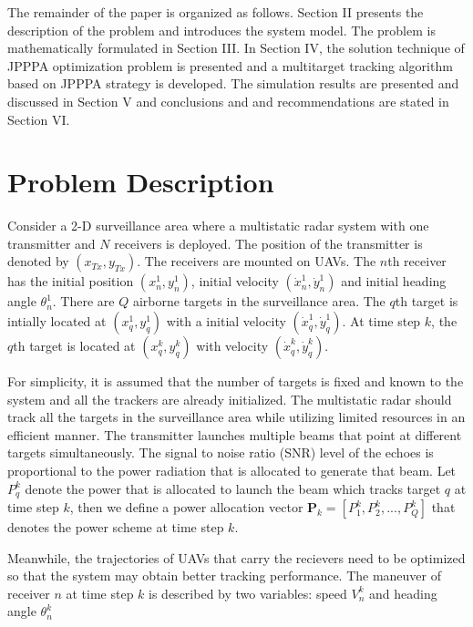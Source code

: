 \documentclass[12pt,journal,draftclsnofoot,onecolumn]{IEEEtran}
\begin{document}
The remainder of the paper is organized as follows. Section II presents the description of the problem and introduces the system model. The problem is mathematically formulated in Section III. In Section IV, the solution technique of JPPPA optimization problem is presented and a multitarget tracking algorithm based on JPPPA strategy is developed. The simulation results are presented and discussed in Section V and conclusions and  and recommendations are stated in Section VI. 

\section{Problem Description}
Consider a 2-D surveillance area where a multistatic radar system with one transmitter and $N$ receivers is deployed. The position of the transmitter is denoted by $(x_{Tx},y_{Tx})$. The receivers are mounted on UAVs. The $n$th receiver has the initial position $(x_n^1,y_n^1)$, initial velocity $(\dot{x}_n^1,\dot{y}_n^1)$ and initial heading angle $\theta_n^1$. There are $Q$ airborne targets in the surveillance area. The $q$th target is intially located at $(x_q^1,y_q^1)$ with a initial velocity $(\dot{x}_q^1,\dot{y}_q^1)$. At time step $k$, the $q$th target is located at $(x_q^k,y_q^k)$ with velocity $(\dot{x}_q^k,\dot{y}_q^k)$.

For simplicity, it is assumed that the number of targets is fixed and known to the system and all the trackers are already initialized. The multistatic radar should track all the targets in the surveillance area while utilizing limited resources in an efficient manner. The transmitter launches multiple beams that point at different targets simultaneously. The signal to noise ratio (SNR) level %
of the echoes is proportional to the power radiation that is allocated to generate that beam. Let $P_q^k$ denote the power that is allocated to launch the beam which tracks target $q$ at time step $k$, then we define a power allocation vector $\mathbf{P}_k=[P_1^k, P_2^k,..., P_Q^k]$ %
that denotes the power scheme at time step $k$. 

Meanwhile, the trajectories of UAVs that carry the recievers need to be optimized so that the system may obtain better tracking performance. The maneuver of receiver $n$ at time step $k$ is described by two variables: speed $V_n^k$ and heading angle $\theta_n^k$
\end{document}
